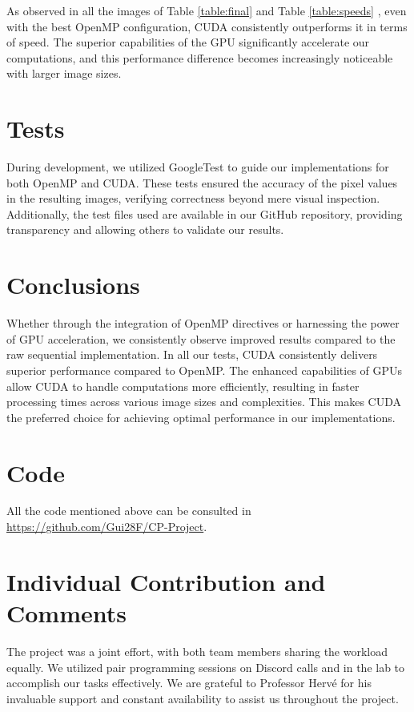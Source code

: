 \documentclass[sigconf]{acmart}
\begin{document}
As observed in all the images of Table \ref{table:final} and Table \ref{table:speeds} , even with the best OpenMP configuration, CUDA consistently outperforms it in terms of speed. The superior capabilities of the GPU significantly accelerate our computations, and this performance difference becomes increasingly noticeable with larger image sizes.

\section{Tests}
During development, we utilized GoogleTest to guide our implementations for both OpenMP and CUDA. These tests ensured the accuracy of the pixel values in the resulting images, verifying correctness beyond mere visual inspection. Additionally, the test files used are available in our GitHub repository, providing transparency and allowing others to validate our results.

\section{Conclusions}
Whether through the integration of OpenMP directives or harnessing the power of GPU acceleration, we consistently observe improved results compared to the raw sequential implementation. In all our tests, CUDA consistently delivers superior performance compared to OpenMP. The enhanced capabilities of GPUs allow CUDA to handle computations more efficiently, resulting in faster processing times across various image sizes and complexities. This makes CUDA the preferred choice for achieving optimal performance in our implementations.

\section{Code}
All the code mentioned above can be consulted in \url{https://github.com/Gui28F/CP-Project}.
\section{Individual Contribution and Comments}
The project was a joint effort, with both team members sharing the workload equally. We utilized pair programming sessions on Discord calls and in the lab to accomplish our tasks effectively. We are grateful to Professor Hervé for his invaluable support and constant availability to assist us throughout the project.


\end{document}
